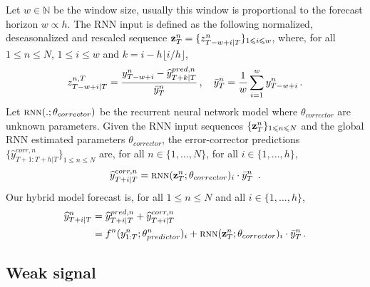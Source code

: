\documentclass[review]{elsarticle}
\newcommand{\ts}{y}
\newcommand{\tspred}{\widehat{\ts}}
\newcommand{\stat}{f}
\newcommand{\statparam}{\theta_{predictor}}
\newcommand{\lag}{h}
\newcommand{\window}{w}
\newcommand{\meants}{\Bar{\ts}}
\newcommand{\rnnwindow}{{\bf \rnninput}}
\newcommand{\rnninput}{z}
\newcommand{\rnn}{\textsc{rnn}}
\newcommand{\rnnparam}{\theta_{corrector}}
\begin{document}
Let $\window \in \mathbb{N}$ be the window size, usually this window is proportional to the forecast horizon $\window \propto \lag$. The RNN input is defined as the following  normalized, deseasonalized and rescaled sequence $\rnnwindow^n_T = \{\rnninput^{n}_{T-\window+i|T}\}_{1\leqslant i \leqslant w}$, where, for all $1\leqslant n \leqslant N$, $1\leqslant i \leqslant w$ and $k = i - h\lfloor i/h \rfloor$, 
$$
\rnninput^{n,T}_{T-w+i|T} = \frac{\ts^n_{T-w+i} -\tspred^{pred,n}_{T+k|T}}{\meants^n_T}\,,\quad \meants^n_T = \frac{1}{w}\sum_{i = 1}^{w}\ts^n_{T-w+i}\,.
$$
Let $\rnn(.;\rnnparam)$ be the recurrent neural network model where $\rnnparam$ are  unknown parameters. Given the RNN input sequences $\{\rnnwindow^n_T\}_{1\leqslant n \leqslant N}$ and the global RNN estimated parameters $\rnnparam$, the error-corrector predictions $\{\tspred^{corr,n}_{T+1:T+\lag|T}\}_{1\leqslant n \leqslant N}$ are, for all $n \in \{1,\ldots,N\}$, for all $i \in \{1,\ldots,\lag\}$,
$$
\tspred^{corr,n}_{T+i|T} = \rnn(\rnnwindow^n_T;\rnnparam)_i \cdot \meants^n_T\ \,.
$$
Our hybrid model forecast is, for all $1\leqslant n \leqslant N$ and all $i \in \{1,\ldots,\lag\}$,
\begin{align}
\label{eq:nows:full:model}
\tspred^n_{T+i|T}  &= \tspred^{pred,n}_{T+i|T} +  \tspred^{corr,n}_{T+i|T} \\
&= \stat^n(\ts^n_{1:T};\statparam^n)_i +  \rnn(\rnnwindow^n_T;\rnnparam)_i \cdot \meants^n_T\,.\nonumber
\end{align}


\subsection{Weak signal}
\end{document}
